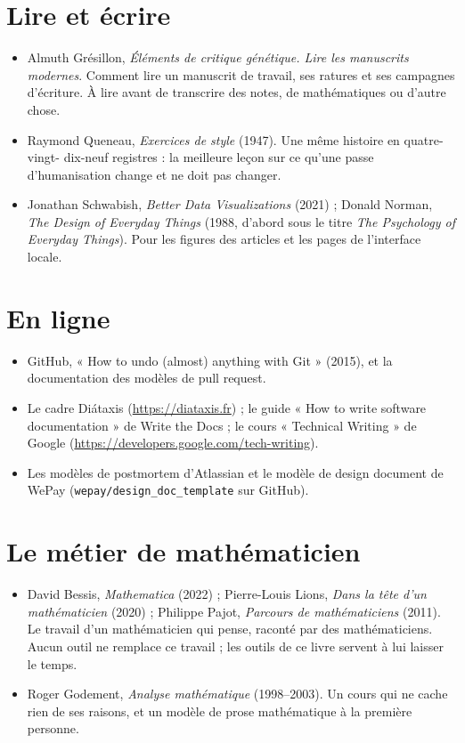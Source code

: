 \section*{Lire et écrire}
\begin{itemize}
  \item Almuth Grésillon, \emph{Éléments de critique génétique. Lire les manuscrits
        modernes}. Comment lire un manuscrit de travail, ses ratures et ses campagnes
        d'écriture. À lire avant de transcrire des notes, de mathématiques ou
        d'autre chose.
  \item Raymond Queneau, \emph{Exercices de style} (1947). Une même histoire en quatre-vingt-
        dix-neuf registres : la meilleure leçon sur ce qu'une passe d'humanisation change et
        ne doit pas changer.
  \item Jonathan Schwabish, \emph{Better Data Visualizations} (2021) ; Donald Norman,
        \emph{The Design of Everyday Things} (1988, d'abord sous le titre \emph{The Psychology of Everyday Things}). Pour les figures des articles et les
        pages de l'interface locale.
\end{itemize}

\section*{En ligne}
\begin{itemize}
  \item GitHub, « How to undo (almost) anything with Git » (2015), et la documentation des
        modèles de pull request.
  \item Le cadre Diátaxis (\url{https://diataxis.fr}) ; le guide « How to write software
        documentation » de Write the Docs ; le cours « Technical Writing » de
        Google (\url{https://developers.google.com/tech-writing}).
  \item Les modèles de postmortem d'Atlassian et le modèle de design document de WePay
        (\texttt{wepay/design\_doc\_template} sur GitHub).
\end{itemize}

\section*{Le métier de mathématicien}
\begin{itemize}
  \item David Bessis, \emph{Mathematica} (2022) ; Pierre-Louis Lions, \emph{Dans la tête
        d'un mathématicien} (2020) ; Philippe Pajot, \emph{Parcours de mathématiciens}
        (2011). Le travail d'un mathématicien qui pense, raconté par des mathématiciens.
        Aucun outil ne remplace ce travail ; les outils de ce livre servent à lui laisser
        le temps.
  \item Roger Godement, \emph{Analyse mathématique} (1998--2003). Un cours qui ne cache
        rien de ses raisons, et un modèle de prose mathématique à la première personne.
\end{itemize}
